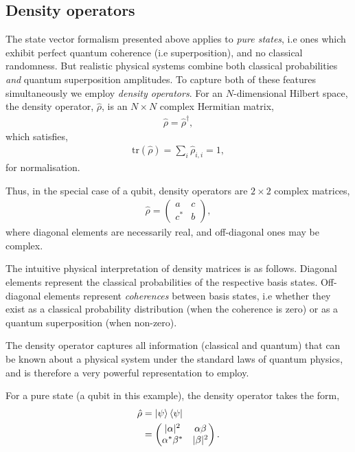 \documentclass[aps,pra,twocolumn,amsmath,amssymb,nofootinbib,superscriptaddress]{revtex4}
\begin{document}
%
%

\subsection{Density operators}

The state vector formalism presented above applies to \textit{pure states}, i.e ones which exhibit perfect quantum coherence (i.e superposition), and no classical randomness. But realistic physical systems combine both classical probabilities \textit{and} quantum superposition amplitudes. To capture both of these features simultaneously we employ \textit{density operators}. For an $N$-dimensional Hilbert space, the density operator, $\hat\rho$, is an \mbox{$N\times N$} complex Hermitian matrix,
\begin{align}
	\hat\rho = \hat\rho^\dag,
\end{align}
which satisfies,
\begin{align}
\mathrm{tr}(\hat\rho)=\sum_i \hat\rho_{i,i} = 1,	
\end{align}
for normalisation.

Thus, in the special case of a qubit, density operators are \mbox{$2\times 2$} complex matrices,
\begin{align}
\hat\rho = \left(\begin{matrix}{}
  a & c \nonumber\\
  c^* & b
\end{matrix}\right),
\end{align}
where diagonal elements are necessarily real, and off-diagonal ones may be complex.

The intuitive physical interpretation of density matrices is as follows. Diagonal elements represent the classical probabilities of the respective basis states. Off-diagonal elements represent \textit{coherences} between basis states, i.e whether they exist as a classical probability distribution (when the coherence is zero) or as a quantum superposition (when non-zero).

The density operator captures all information (classical and quantum) that can be known about a physical system under the standard laws of quantum physics, and is therefore a very powerful representation to employ.

For a pure state (a qubit in this example), the density operator takes the form,
\begin{align}
\hat\rho &= \ket\psi\bra\psi\nonumber\\
&= \left(\begin{matrix}{}
  |\alpha|^2 & \alpha\beta \nonumber\\
  \alpha^*\beta^* & |\beta|^2
\end{matrix}\right).
\end{align}
\end{document}
